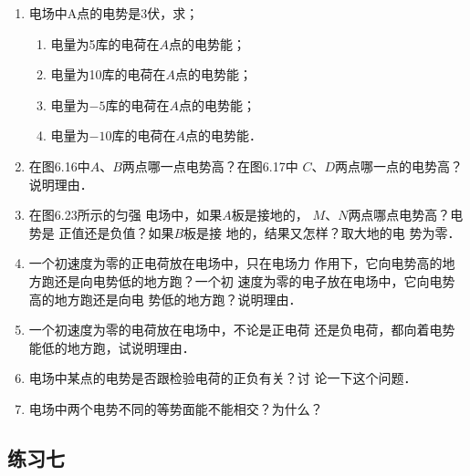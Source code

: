 \begin{enumerate}
	\item 电场中A点的电势是3伏，求；
	\begin{enumerate}
		\item 电量为5库的电荷在$A$点的电势能；
		\item 电量为10库的电荷在$A$点的电势能；
		\item 电量为$-5$库的电荷在$A$点的电势能；
		\item 电量为$-10$库的电荷在$A$点的电势能．
	\end{enumerate}
	\item 在图6.16中$A$、$B$两点哪一点电势高？在图6.17中
$C$、$D$两点哪一点的电势高？说明理由．

\item 在图6.23所示的匀强
电场中，如果$A$板是接地的，
$M$、$N$两点哪点电势高？电势是
正值还是负值？如果$B$板是接
地的，结果又怎样？取大地的电
势为零．

\begin{figure}[htp]\centering
    \caption{}
\end{figure}	

\item 一个初速度为零的正电荷放在电场中，只在电场力
作用下，它向电势高的地方跑还是向电势低的地方跑？一个初
速度为零的电子放在电场中，它向电势高的地方跑还是向电
势低的地方跑？说明理由．
\item 一个初速度为零的电荷放在电场中，不论是正电荷
还是负电荷，都向着电势能低的地方跑，试说明理由．
\item 电场中某点的电势是否跟检验电荷的正负有关？讨
论一下这个问题．
\item 电场中两个电势不同的等势面能不能相交？为什么？
\end{enumerate}



\subsection{练习七}

